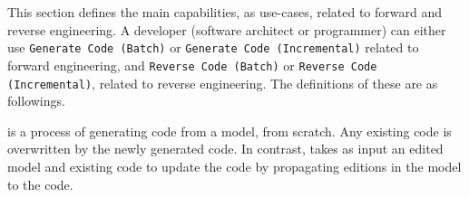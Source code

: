 


This section defines the main capabilities, as use-cases, related to forward and reverse engineering. 
A developer (software architect or programmer) can either use \texttt{Generate Code (Batch)} or \texttt{Generate Code (Incremental)} related to forward engineering, and \texttt{Reverse Code (Batch)} or \texttt{Reverse Code (Incremental)}, related to reverse engineering. The definitions of these are as followings.

\begin{definition} \cite{Giese2006} is a process of generating code
	from a model, from scratch.
	Any existing code is overwritten by the newly generated code.
	In contrast,  takes as input an edited model and existing code to update the code by propagating
	editions in the model to the code.
\end{definition}

